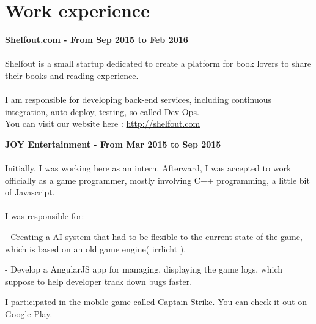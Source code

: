 \documentclass[letterpaper]{article}
\renewenvironment{itemize}{
  \begin{list}{}{
    \setlength{\leftmargin}{1.5em}
  }
}{
  \end{list}
}
\begin{document}
\section*{Work experience}
\begin{itemize}
\item {\bf Shelfout.com - From Sep 2015 to Feb 2016}
\\
\\
Shelfout is a small startup dedicated to create a platform for book lovers to share their books and reading experience. 
\\
\\
I am responsible for developing back-end services, including continuous integration, auto deploy, testing, so called Dev Ops.
\\
You can visit our website here : 
\href{http://shelfout.com}{http://shelfout.com}


\leftskip 0in
\item {\bf JOY Entertainment - From Mar 2015 to Sep 2015}
\\
\\
Initially, I was working here as an intern. Afterward, I was accepted to work officially as a game programmer, mostly involving C++ programming, a little bit of Javascript.
\\
\\
I was responsible for:
\begin{itemize}
\item{-  Creating a AI system that had to be flexible to the current state of the game, which is based on an old game engine( irrlicht ). }
\item{-  Develop a AngularJS app for managing, displaying the game logs, which suppose to help developer track down bugs faster.}
\end{itemize}
I participated in the mobile game called Captain Strike. You can check it out on Google Play\cite{captain}.
\end{itemize}
\end{document}
